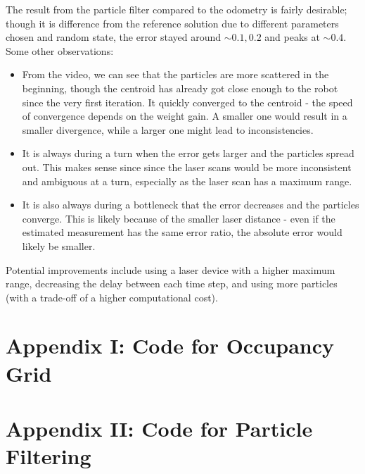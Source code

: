 \documentclass{article} %
\begin{document}
The result from the particle filter compared to the odometry is fairly desirable; though it is difference from the reference solution due to different parameters chosen and random state, the error stayed around $\sim0.1, 0.2$ and peaks at $\sim0.4$. Some other observations:
\begin{itemize}
  \item From the video, we can see that the particles are more scattered in the beginning, though the centroid has already got close enough to the robot since the very first iteration. It quickly converged to the centroid - the speed of convergence depends on the weight gain. A smaller one would result in a smaller divergence, while a larger one might lead to inconsistencies.
  \item It is always during a turn when the error gets larger and the particles spread out. This makes sense since since the laser scans would be more inconsistent and ambiguous at a turn, especially as the laser scan has a maximum range.
  \item It is also always during a bottleneck that the error decreases and the particles converge. This is likely because of the smaller laser distance - even if the estimated measurement has the same error ratio, the absolute error would likely be smaller.
\end{itemize}

Potential improvements include using a laser device with a higher maximum range, decreasing the delay between each time step, and using more particles (with a trade-off of a higher computational cost).

\clearpage
\section*{Appendix I: Code for Occupancy Grid}


\clearpage
\section*{Appendix II: Code for Particle Filtering}

\end{document}

